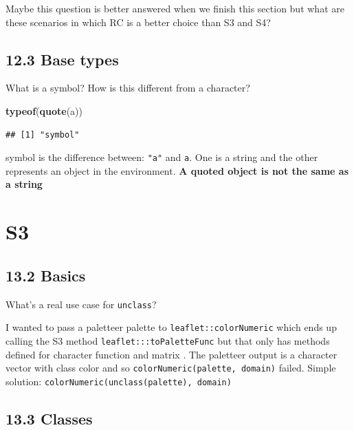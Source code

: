 \documentclass[]{book}
\newenvironment{Shaded}{\begin{snugshade}}{\end{snugshade}}
\newcommand{\KeywordTok}[1]{\textcolor[rgb]{0.13,0.29,0.53}{\textbf{#1}}}
\newcommand{\NormalTok}[1]{#1}
\begin{document}
Maybe this question is better answered when we finish this section but what are these scenarios in which RC is a better choice than S3 and S4?

\hypertarget{base-types-1}{%
\section*{12.3 Base types}\label{base-types-1}}

What is a symbol? How is this different from a character?

\begin{Shaded}
\begin{Highlighting}[]
\KeywordTok{typeof}\NormalTok{(}\KeywordTok{quote}\NormalTok{(a))}
\end{Highlighting}
\end{Shaded}

\begin{verbatim}
## [1] "symbol"
\end{verbatim}

symbol is the difference between: \texttt{"a"} and \texttt{a}. One is a string and the other represents an object in the environment. \textbf{A quoted object is not the same as a string}

\hypertarget{s3}{%
\chapter{S3}\label{s3}}

\hypertarget{basics}{%
\section*{13.2 Basics}\label{basics}}

What's a real use case for \texttt{unclass}?

I wanted to pass a paletteer palette to \texttt{leaflet::colorNumeric} which ends up calling the S3 method \texttt{leaflet:::toPaletteFunc} but that only has methods defined for character function and matrix . The paletteer output is a character vector with class color and so \texttt{colorNumeric(palette,\ domain)} failed. Simple solution: \texttt{colorNumeric(unclass(palette),\ domain)}

\hypertarget{classes}{%
\section*{13.3 Classes}\label{classes}}
\end{document}
